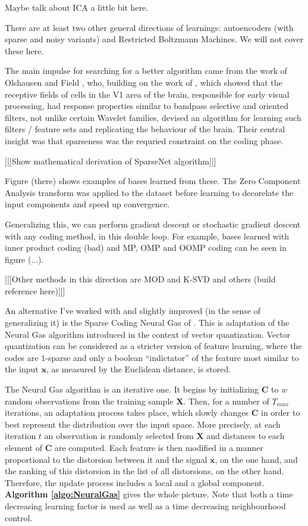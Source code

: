 \documentclass[12pt,a4paper,oneside,english]{UPBThesis}
\begin{document}
Maybe talk about ICA a little bit here.

There are at least two other general directions of learnings: autoencoders (with sparse and noisy variants) and Restricted Boltzmann Machines. We will not cover these here.

The main impulse for searching for a better algorithm came from the work of Olshausen and Field \cite{emergence-sparse-coding,sparse-coding-strategy-V1}, who, building on the work of \cite{macaque-cortex}, which showed that the receptive fields of cells in the V1 area of the brain, responsible for early visual processing, had response properties similar to bandpass selective and oriented filters, not unlike certain Wavelet families, devised an algorithm for learning such filters / feature sets and replicating the behaviour of the brain. Their central insight was that sparseness was the requried constraint on the coding phase.

[[[Show mathematical derivation of SparseNet algorithm]]]

Figure (there) shows examples of bases learned from these. The Zero Component Analysis transform was applied to the dataset before learning to decorelate the input components and speed up convergence.

Generalizing this, we can perform gradient descent or stochastic gradient descent with any coding method, in this double loop. For example, bases learned with inner product coding (bad) and MP, OMP and OOMP coding can be seen in figure (...).

[[[Other methods in this direction are MOD and K-SVD and others (build reference here)]]]

An alternative I've worked with and slightly improved (in the sense of generalizing it) is the Sparse Coding Neural Gas of \cite{sparse-coding-neural-gas-1,sparse-coding-neural-gas-2,sparse-coding-neural-gas-3, sparse-coding-neural-gas-4}. This is adaptation of the Neural Gas \cite{neural-gas-1,neural-gas-2} algorithm introduced in the context of vector quantization. Vector quantization can be considered as a stricter version of feature learning, where the codes are $1$-sparse and only a boolean ``indictator'' of the feature most similar to the input $\textbf{x}$, as measured by the Euclidean distance, is stored.

The Neural Gas algorithm is an iterative one. It begins by initializing $\textbf{C}$ to $w$ random observations from the training sample $\textbf{X}$. Then, for a number of $T_{max}$ iterations, an adaptation process takes place, which slowly changes $\textbf{C}$ in order to best represent the distribution over the input space. More precisely, at each iteration $t$ an observation is randomly selected from $\textbf{X}$ and distances to each element of $\textbf{C}$ are computed. Each feature is then modified in a manner proportional to the distorsion between it and the signal $\textbf{x}$, on the one hand, and the ranking of this distorsion in the list of all distorsions, on the other hand. Therefore, the update process includes a local and a global component. \textbf{Algorithm \ref{algo:NeuralGas}} gives the whole picture. Note that both a time decreasing learning factor is used as well as a time decreasing neighbourhood control. 
\end{document}
